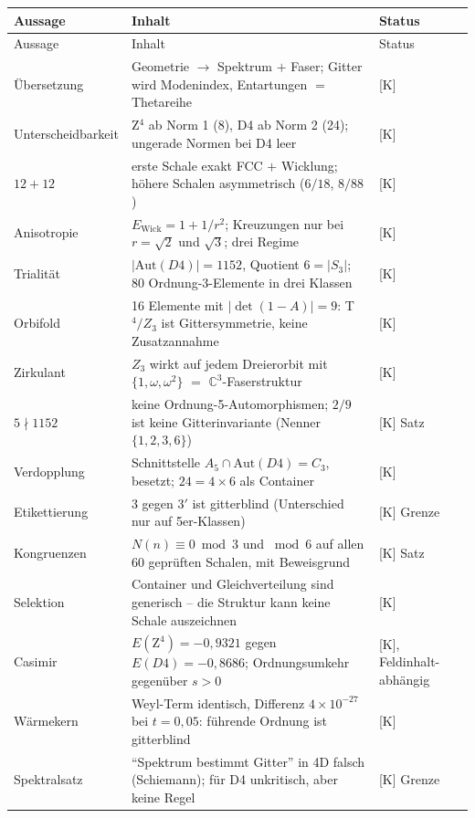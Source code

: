 \documentclass[11pt]{report}
\begin{document}
{\small
\begin{longtable}{lp{6.4cm}l}
\toprule
Aussage & Inhalt & Status \\
\midrule
\endfirsthead
\toprule
Aussage & Inhalt & Status \\
\midrule
\endhead
\bottomrule
\endfoot
Übersetzung & Geometrie $\to$ Spektrum $+$ Faser; Gitter wird
  Modenindex, Entartungen $=$ Thetareihe & [K] \\
Unterscheidbarkeit & Z$^4$ ab Norm 1 (8), D4 ab Norm 2 (24);
  ungerade Normen bei D4 leer & [K] \\
$12+12$ & erste Schale exakt FCC $+$ Wicklung; höhere Schalen
  asymmetrisch ($6/18$, $8/88$) & [K] \\
Anisotropie & $E_\text{Wick} = 1 + 1/r^2$; Kreuzungen nur bei
  $r = \sqrt2$ und $\sqrt3$; drei Regime & [K] \\
Trialität & $|\text{Aut}(D4)| = 1152$, Quotient $6 = |S_3|$;
  80 Ordnung-3-Elemente in drei Klassen & [K] \\
Orbifold & 16 Elemente mit $|\det(1-A)| = 9$: T$^4/Z_3$ ist
  Gittersymmetrie, keine Zusatzannahme & [K] \\
Zirkulant & $Z_3$ wirkt auf jedem Dreierorbit mit
  $\{1,\omega,\omega^2\}$ $=$ $\mathbb{C}^3$-Faserstruktur & [K] \\
$5 \nmid 1152$ & keine Ordnung-5-Automorphismen; $2/9$ ist keine
  Gitterinvariante (Nenner $\{1,2,3,6\}$) & [K] Satz \\
Verdopplung & Schnittstelle $A_5 \cap \text{Aut}(D4) = C_3$,
  besetzt; $24 = 4\times6$ als Container & [K] \\
Etikettierung & $3$ gegen $3'$ ist gitterblind (Unterschied nur auf
  5er-Klassen) & [K] Grenze \\
Kongruenzen & $N(n) \equiv 0 \bmod 3$ und $\bmod 6$ auf allen
  60 geprüften Schalen, mit Beweisgrund & [K] Satz \\
Selektion & Container und Gleichverteilung sind generisch --
  die Struktur kann keine Schale auszeichnen & [K] \\
Casimir & $E(\text{Z}^4) = -0{,}9321$ gegen
  $E(D4) = -0{,}8686$; Ordnungsumkehr gegenüber $s>0$
  & [K], Feldinhalt-abhängig \\
Wärmekern & Weyl-Term identisch, Differenz $4\times10^{-27}$ bei
  $t = 0{,}05$: führende Ordnung ist gitterblind & [K] \\
Spektralsatz & \enquote{Spektrum bestimmt Gitter} in 4D falsch
  (Schiemann); für D4 unkritisch, aber keine Regel & [K] Grenze \\

\end{longtable}}
\end{document}

